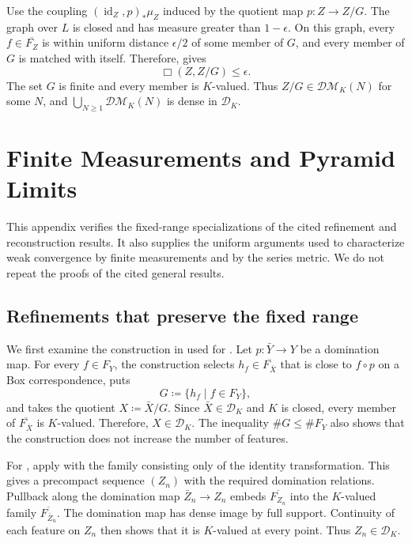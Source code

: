\documentclass[10pt,a4paper]{amsart}
\newcommand{\DK}{\mathcal D_K}
\newcommand{\DM}{\mathcal{DM}}
\begin{document}
Use the coupling $(\operatorname{id}_Z,p)_*\mu_Z$ induced by the quotient map $p\colon Z\to Z/G$. The graph over $L$ is closed and has measure greater than $1-\epsilon$. On this graph, every $f\in\overline{F_Z}$ is within uniform distance $\epsilon/2$ of some member of $G$, and every member of $G$ is matched with itself. Therefore,  gives
\[
\Box(Z,Z/G)\leq\epsilon.
\]
The set $G$ is finite and every member is $K$-valued. Thus $Z/G\in\DM_K(N)$ for some $N$, and $\bigcup_{N\geq1}\DM_K(N)$ is dense in $\DK$.

\section{Finite Measurements and Pyramid Limits}
\label{app:pyramid-technical}

This appendix verifies the fixed-range specializations of the cited refinement and reconstruction results. It also supplies the uniform arguments used to characterize weak convergence by finite measurements and by the series metric. We do not repeat the proofs of the cited general results.

\subsection{Refinements that preserve the fixed range}
\label{subsec:app-K-refinement}

We first examine the construction in \cite[Lemma~5.4]{gds2} used for . Let $p\colon\bar Y\to Y$ be a domination map. For every $f\in F_Y$, the construction selects $h_f\in\overline{F_{\bar X}}$ that is close to $f\circ p$ on a Box correspondence, puts
\[
G\coloneqq\{h_f\mid f\in F_Y\},
\]
and takes the quotient $X\coloneqq\bar X/G$. Since $\bar X\in\DK$ and $K$ is closed, every member of $\overline{F_{\bar X}}$ is $K$-valued. Therefore, $X\in\DK$. The inequality $\#G\leq\#F_Y$ also shows that the construction does not increase the number of features.

For , apply \cite[Lemma~5.6]{gds2} with the family consisting only of the identity transformation. This gives a precompact sequence $(Z_n)$ with the required domination relations. Pullback along the domination map $\bar Z_n\to Z_n$ embeds $\overline{F_{Z_n}}$ into the $K$-valued family $\overline{F_{\bar Z_n}}$. The domination map has dense image by full support. Continuity of each feature on $Z_n$ then shows that it is $K$-valued at every point. Thus $Z_n\in\DK$.
\end{document}
